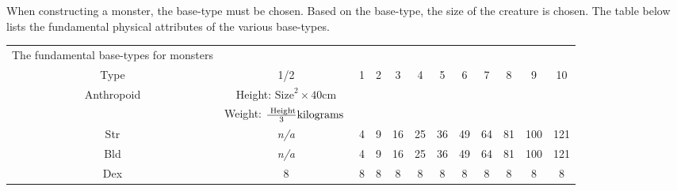 \documentclass[twoside]{book}
\begin{document}
    {  
     When constructing a monster, the base-type must be
               chosen. Based on the base-type, the size of the creature
               is chosen. The table below lists the fundamental physical
               attributes of the various base-types. 
    }
  
\begin{table}[htb]
  \begin{center}

  \begin{tabular}{|c|c|c|c|c|c|c|c|c|c|c|c|}
  \hline
    
  \textscbf{}&
  \textscbf{}&
  \textscbf{}&
  \textscbf{}&
  \textscbf{}&
  \textscbf{}&
  \textscbf{}&
  \textscbf{}&
  \textscbf{}&
  \textscbf{}&
  \textscbf{}&
  \textscbf{}\\
  \hline
  \hline
      
                    The fundamental base-types for monsters
                  \\

\hline

 Type & 1/2 & 1 & 2 & 3 & 4 & 5 & 6 & 7 & 8 & 9 & 10 \\

\hline

 Anthropoid &  Height: \begin{math}    
                        {\textrm{Size}}^{ 2 }   \times     40 \textrm{
                           cm}    \end{math}
                  \\

\hline

&  Weight: \begin{math}    {{\textrm{
                     Height}}\over{ 3 }}  \textrm{kilograms
                    }    \end{math}
                  \\

\hline

 Str &
                    \textit{n/a}
                  & 4 & 9 & 16 & 25 & 36 & 49 & 64 & 81 & 100 & 121 \\

\hline

 Bld &
                    \textit{n/a}
                  & 4 & 9 & 16 & 25 & 36 & 49 & 64 & 81 & 100 & 121 \\

\hline

 Dex & 8 & 8 & 8 & 8 & 8 & 8 & 8 & 8 & 8 & 8 & 8 \\


\end{tabular}
\end{center}
\end{table}
\end{document}

